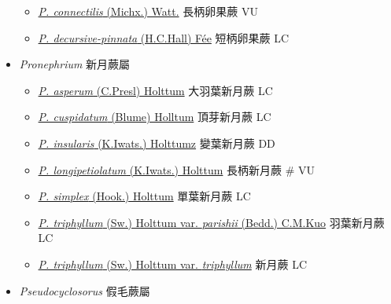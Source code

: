 \begin{itemize}
  \begin{itemize}
        \item[] \href{http://www.theplantlist.org/tpl1.1/search?q=Phegopteris+connectilis}{\textit{P. connectilis} (Michx.) Watt.}   長柄卵果蕨   VU
        \item[] \href{http://www.theplantlist.org/tpl1.1/search?q=Phegopteris+decursive-pinnata}{\textit{P. decursive-pinnata} (H.C.Hall) Fée}   短柄卵果蕨   LC
  \end{itemize}
 \item[    ] \textit{Pronephrium} 新月蕨屬
                                
  \begin{itemize}
        \item[] \href{http://www.theplantlist.org/tpl1.1/search?q=Pronephrium+asperum}{\textit{P. asperum} (C.Presl) Holttum}   大羽葉新月蕨   LC
        \item[] \href{http://www.theplantlist.org/tpl1.1/search?q=Pronephrium+cuspidatum}{\textit{P. cuspidatum} (Blume) Holltum}   頂芽新月蕨   LC
        \item[] \href{http://www.theplantlist.org/tpl1.1/search?q=Pronephrium+insularis}{\textit{P. insularis} (K.Iwats.) Holttumz}   變葉新月蕨   DD
        \item[] \href{http://www.theplantlist.org/tpl1.1/search?q=Pronephrium+longipetiolatum}{\textit{P. longipetiolatum} (K.Iwats.) Holttum}   長柄新月蕨  \# VU
        \item[] \href{http://www.theplantlist.org/tpl1.1/search?q=Pronephrium+simplex}{\textit{P. simplex} (Hook.) Holttum}   單葉新月蕨   LC
        \item[] \href{http://www.theplantlist.org/tpl1.1/search?q=Pronephrium+triphyllum+var.+parishii}{\textit{P. triphyllum} (Sw.) Holttum var. \textit{parishii} (Bedd.) C.M.Kuo}  
                                        羽葉新月蕨   LC
        \item[] \href{http://www.theplantlist.org/tpl1.1/search?q=Pronephrium+triphyllum+var.+triphyllum}{\textit{P. triphyllum} (Sw.) Holttum var. \textit{triphyllum}}  
                                        新月蕨   LC
  \end{itemize}
 \item[    ] \textit{Pseudocyclosorus} 假毛蕨屬
                                

\end{itemize}
